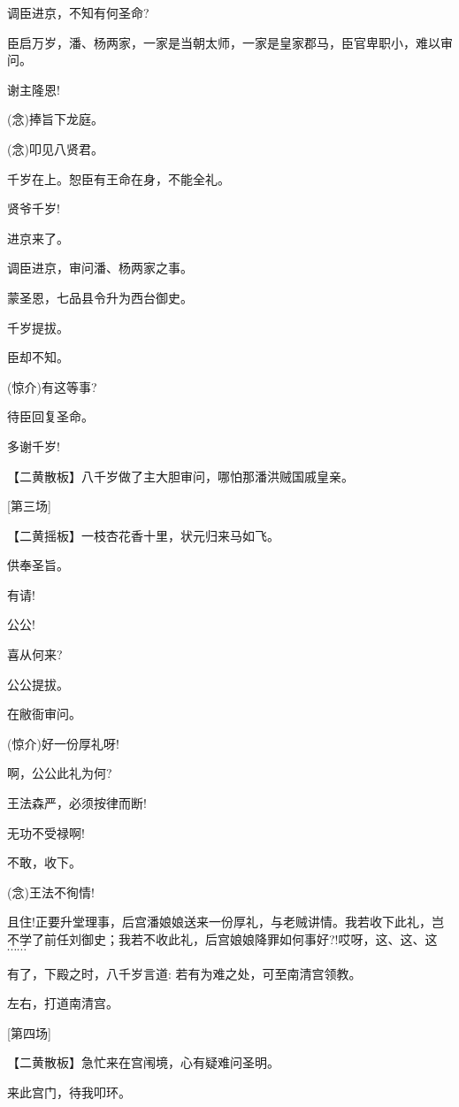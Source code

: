 {{调臣进京，不知有何圣命?}

{臣启万岁，潘、杨两家，一家是当朝太师，一家是皇家郡马，臣官卑职小，难以审问。}

{谢主隆恩!}

{({\akai 念})捧旨下龙庭。}

{({\akai 念})叩见八贤君。}

{千岁在上。恕臣有王命在身，不能全礼。}

{贤爷千岁!}

{进京来了。}

{调臣进京，审问潘、杨两家之事。}

{蒙圣恩，七品县令升为西台御史。}

{千岁提拔。}

{臣却不知。}

{(惊介)有这等事?}

{待臣回复圣命。}

{多谢千岁!}

\setlength{\hangindent}{60pt} {【{\akai 二黄散板}】八千岁做了主大胆审问，哪怕那潘洪贼国戚皇亲。}

{[}第三场{]}

\setlength{\hangindent}{60pt} {【{\akai 二黄摇板}】一枝杏花香十里，状元归来马如飞。}

{供奉圣旨。}

{有请!}

{公公!}

{喜从何来?}

{公公提拔。}

{在敝衙审问。}

{(惊介)好一份厚礼呀!}

{啊，公公此礼为何?}

{王法森严，必须按律而断!}

{无功不受禄啊!}

{不敢，收下。}

{({\akai 念})王法不徇情!}

{且住!正要升堂理事，后宫潘娘娘送来一份厚礼，与老贼讲情。我若收下此礼，岂不学了前任刘御史；我若不收此礼，后宫娘娘降罪如何事好?!哎呀，这、这、这$\cdots{}\cdots{}$}

{有了，下殿之时，八千岁言道: 若有为难之处，可至南清宫领教。}

{左右，打道南清宫。}

{[}第四场{]}

\setlength{\hangindent}{60pt} {【{\akai 二黄散板}】急忙来在宫闱境，心有疑难问圣明。}

{来此宫门，待我叩环。}

}
